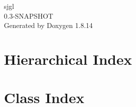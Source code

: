 \documentclass[twoside]{book}
\newcommand{\+}{\discretionary{\mbox{\scriptsize$\hookleftarrow$}}{}{}}
\newcommand{\clearemptydoublepage}{%
  \newpage{\pagestyle{empty}\cleardoublepage}%
}
\begin{document}
\hypersetup{pageanchor=false,
             bookmarksnumbered=true,
             pdfencoding=unicode
            }
\begin{titlepage}
\vspace*{7cm}
\begin{center}%
{\Large sjgl \\[1ex]\large 0.\+3-\/\+S\+N\+A\+P\+S\+H\+OT }\\
\vspace*{1cm}
{\large Generated by Doxygen 1.8.14}\\
\end{center}
\end{titlepage}
\clearemptydoublepage
{}
\tableofcontents
\clearemptydoublepage
{}
\hypersetup{pageanchor=true}

\chapter{Hierarchical Index}

\chapter{Class Index}

\end{document}

